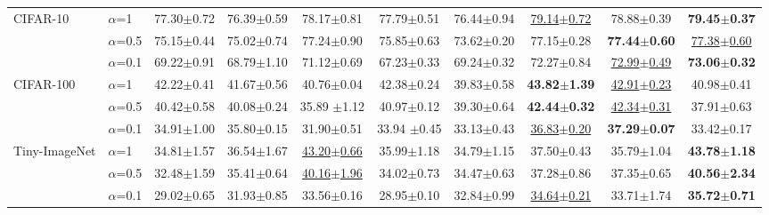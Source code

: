 \documentclass{article} %
\begin{document}
\begin{table*}[!htb]
{\begin{tabular}{llcccccccc}
  \hline
  \multirow{3}{*}{CIFAR-10} &  $\alpha$=1 &77.30$\pm$0.72 & 76.39$\pm$0.59 & 78.17$\pm$0.81 & 77.79$\pm$0.51 &76.44$\pm$0.94 & \underline{79.14$\pm$0.72} & 78.88$\pm$0.39 & \bf{79.45$\pm$0.37} \\
  &$\alpha$=0.5 & 75.15$\pm$0.44 & 75.02$\pm$0.74 & 77.24$\pm$0.90 & 75.85$\pm$0.63 & 73.62$\pm$0.20 &77.15$\pm$0.28 & \bf{77.44$\pm$0.60} & \underline{77.38$\pm$0.60}\\
  &$\alpha$=0.1 &69.22$\pm$0.91 & 68.79$\pm$1.10 & 71.12$\pm$0.69 & 67.23$\pm$0.33 & 69.24$\pm$0.32 & 72.27$\pm$0.84 & \underline{72.99$\pm$0.49} & \bf{73.06$\pm$0.32} \\
  \hline
  \multirow{3}{*}{CIFAR-100} & $\alpha$=1 & 42.22$\pm$0.41 & 41.67$\pm$0.56 & 40.76$\pm$0.04 & 42.38$\pm$0.24 & 39.83$\pm$0.58 & \bf{43.82$\pm$1.39} & \underline{42.91$\pm$0.23} & 40.98$\pm$0.41 \\
  &$\alpha$=0.5 & 40.42$\pm$0.58 & 40.08$\pm$0.24 & 35.89 $\pm$1.12 & 40.97$\pm$0.12 & 39.30$\pm$0.64 & \bf{42.44$\pm$0.32}& \underline{42.34$\pm$0.31} & 37.91$\pm$0.63 \\
  &$\alpha$=0.1 & 34.91$\pm$1.00 & 35.80$\pm$0.15 & 31.90$\pm$0.51 & 33.94 $\pm$0.45 & 33.13$\pm$0.43 & \underline{36.83$\pm$0.20}&\bf{37.29$\pm$0.07} & 33.42$\pm$0.17  \\
  \hline
  \multirow{3}{*}{Tiny-ImageNet}
  &$\alpha$=1 &34.81$\pm$1.57 & 36.54$\pm$1.67 & \underline{43.20$\pm$0.66} & 35.99$\pm$1.18 & 34.79$\pm$1.15 & 37.50$\pm$0.43 &35.79$\pm$1.04 & \bf{43.78$\pm$1.18}\\
  &$\alpha$=0.5 & 32.48$\pm$1.59 & 35.41$\pm$0.64 & \underline{40.16$\pm$1.96} & 34.02$\pm$0.73 & 34.47$\pm$0.63 & 37.28$\pm$0.86 & 37.35$\pm$0.65 & \bf{40.56$\pm$2.34} \\
  &$\alpha$=0.1 & 29.02$\pm$0.65 & 31.93$\pm$0.85 & 33.56$\pm$0.16 & 28.95$\pm$0.10 & 32.84$\pm$0.99  & \underline{34.64$\pm$0.21} &33.71$\pm$1.74 & \bf{35.72$\pm$0.71} \\
  \bottomrule

  \end{tabular}
  }
 \label{tbl:table_compare}
\end{table*}
\end{document}
